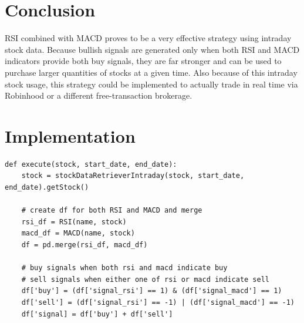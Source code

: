 \documentclass[letterpaper,11pt]{article}
\begin{document}
\section*{Conclusion}
RSI combined with MACD proves to be a very effective strategy using intraday stock data. Because bullish signals are generated only when both RSI and MACD indicators provide both buy signals, they are far stronger and can be used to purchase larger quantities of stocks at a given time. Also because of this intraday stock usage, this strategy could be implemented to actually trade in real time via Robinhood or a different free-transaction brokerage.

\section*{Implementation}
\begin{verbatim}
def execute(stock, start_date, end_date):
    stock = stockDataRetrieverIntraday(stock, start_date, end_date).getStock()
	
    # create df for both RSI and MACD and merge
    rsi_df = RSI(name, stock)
    macd_df = MACD(name, stock)
    df = pd.merge(rsi_df, macd_df)
    
    # buy signals when both rsi and macd indicate buy
    # sell signals when either one of rsi or macd indicate sell
    df['buy'] = (df['signal_rsi'] == 1) & (df['signal_macd'] == 1)
    df['sell'] = (df['signal_rsi'] == -1) | (df['signal_macd'] == -1)
    df['signal] = df['buy'] + df['sell']

\end{verbatim}



\end{document}
